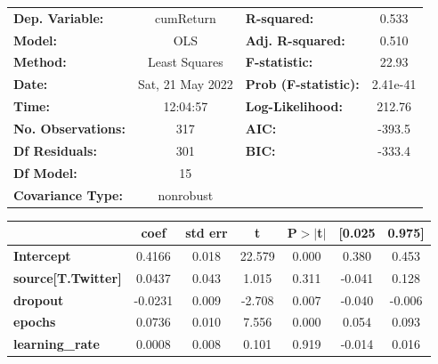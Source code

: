\begin{center}
\begin{tabular}{lclc}
\toprule
\textbf{Dep. Variable:}              &    cumReturn     & \textbf{  R-squared:         } &     0.533   \\
\textbf{Model:}                      &       OLS        & \textbf{  Adj. R-squared:    } &     0.510   \\
\textbf{Method:}                     &  Least Squares   & \textbf{  F-statistic:       } &     22.93   \\
\textbf{Date:}                       & Sat, 21 May 2022 & \textbf{  Prob (F-statistic):} &  2.41e-41   \\
\textbf{Time:}                       &     12:04:57     & \textbf{  Log-Likelihood:    } &    212.76   \\
\textbf{No. Observations:}           &         317      & \textbf{  AIC:               } &    -393.5   \\
\textbf{Df Residuals:}               &         301      & \textbf{  BIC:               } &    -333.4   \\
\textbf{Df Model:}                   &          15      & \textbf{                     } &             \\
\textbf{Covariance Type:}            &    nonrobust     & \textbf{                     } &             \\
\bottomrule
\end{tabular}
\begin{tabular}{lcccccc}
                                     & \textbf{coef} & \textbf{std err} & \textbf{t} & \textbf{P$> |$t$|$} & \textbf{[0.025} & \textbf{0.975]}  \\
\midrule
\textbf{Intercept}                   &       0.4166  &        0.018     &    22.579  &         0.000        &        0.380    &        0.453     \\
\textbf{source[T.Twitter]}           &       0.0437  &        0.043     &     1.015  &         0.311        &       -0.041    &        0.128     \\
\textbf{dropout}                     &      -0.0231  &        0.009     &    -2.708  &         0.007        &       -0.040    &       -0.006     \\
\textbf{epochs}                      &       0.0736  &        0.010     &     7.556  &         0.000        &        0.054    &        0.093     \\
\textbf{learning\_rate}              &       0.0008  &        0.008     &     0.101  &         0.919        &       -0.014    &        0.016     \\

\end{tabular}
\end{center}
